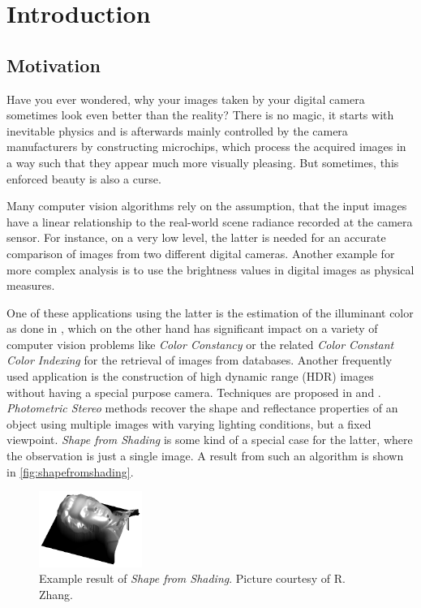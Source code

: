 \chapter{Introduction}
\label{chap:introduction}

\section{Motivation}
\label{sec:motivation}
Have you ever wondered, why your images taken by your digital camera sometimes look even better than the reality? There is no magic, it starts with inevitable physics and is afterwards mainly controlled by the camera manufacturers by constructing microchips, which process the acquired images in a way such that they appear much more visually pleasing. But sometimes, this enforced beauty is also a curse.

Many computer vision algorithms rely on the assumption, that the input images have a linear relationship to the real-world scene radiance recorded at the camera sensor. For instance, on a very low level, the latter is needed for an accurate comparison of images from two different digital cameras. Another example for more complex analysis is to use the brightness values in digital images as physical measures.

One of these applications using the latter is the estimation of the illuminant color as done in \cite{tancolorconstancy}, which on the other hand has significant impact on a variety of computer vision problems like \emph{Color Constancy} \cite{finlayson2001color} or the related \emph{Color Constant Color Indexing} \cite{funt1995color} for the retrieval of images from databases. Another frequently used application is the construction of high dynamic range (HDR) images without having a special purpose camera. Techniques are proposed in \cite{mann1995being, CAVE_0068} and \cite{debevec2008recovering}. \emph{Photometric Stereo} methods \cite{woodham1980photometric, basri2007photometric} recover the shape and reflectance properties of an object using multiple images with varying lighting conditions, but a fixed viewpoint. \emph{Shape from Shading} \cite{zhang1999shape} is some kind of a special case for the latter, where the observation is just a single image. A result from such an algorithm is shown in \autoref{fig:shapefromshading}.

\begin{figure}
	\centering
	\includegraphics[width=0.3\textwidth]{images/shapefromshading.png}
	\caption[Example result of \emph{Shape from Shading}]{Example result of \emph{Shape from Shading}. Picture courtesy of R. Zhang.}
	\label{fig:shapefromshading}
\end{figure}

